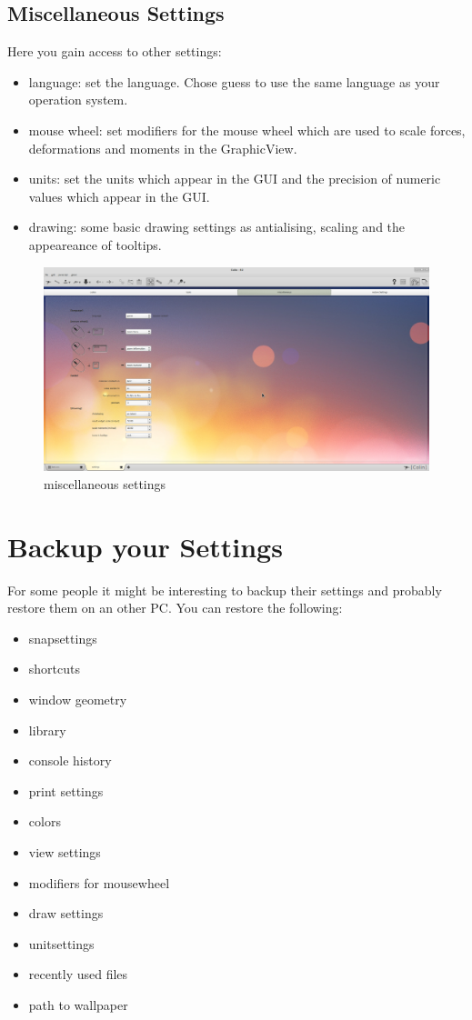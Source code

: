 \documentclass[a4paper,11pt]{report}
\begin{document}
\subsection{Miscellaneous Settings}
\label{ssec:miscsettings}
Here you gain access to other settings:
\begin{itemize}
	\item language: set the language. Chose guess to use the same language as your operation system.
	\item mouse wheel: set modifiers for the mouse wheel which are used to scale forces, deformations and moments in the GraphicView.
	\item units: set the units which appear in the GUI and the precision of numeric values which appear in the GUI.
	\item drawing: some basic drawing settings as antialising, scaling and the appeareance of tooltips.
\end{itemize}
\begin{figure}[H]
\includegraphics[width=\textwidth]{../pictures/settings_misc.png}
\caption{miscellaneous settings}
\label{pic:miscsettings}
\end{figure}


\section{Backup your Settings}

For some people it might be interesting to backup their settings and probably restore them on an other PC. You can restore the following:

\begin{itemize}
	\item snapsettings
	\item shortcuts
	\item window geometry
	\item library
	\item console history
	\item print settings
	\item colors 
	\item view settings 
	\item modifiers for mousewheel
	\item draw settings
	\item unitsettings
	\item recently used files
	\item path to wallpaper
\end{itemize}
\end{document}
